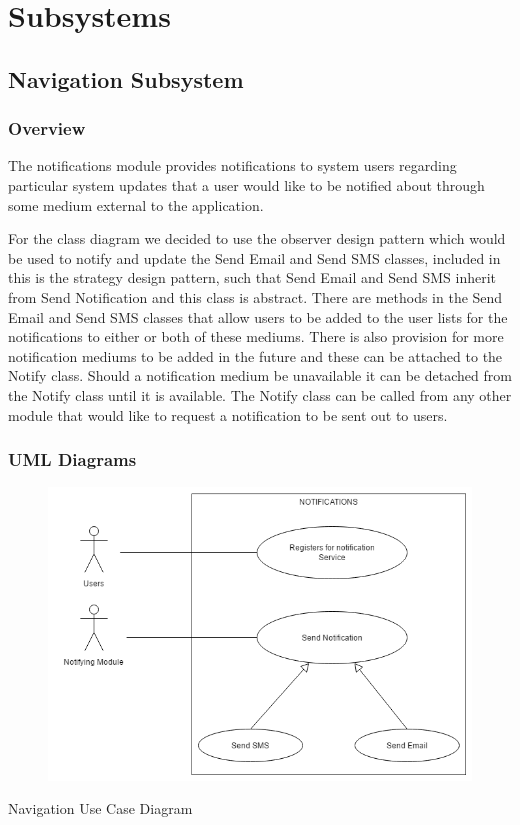 \documentclass{article}
\begin{document}
\section{Subsystems}
\subsection{Navigation Subsystem}
\subsubsection{Overview}
The notifications module provides notifications to system users regarding
particular system updates that a user would like to be notified about through
some medium external to the application.
\begin{flushleft}
For the class diagram we decided to use the observer design pattern which would be used to notify and update the Send Email and Send SMS classes, included in this is the strategy design pattern, such that Send Email and Send SMS inherit from Send Notification and this class is abstract. There are methods in the Send Email and Send SMS classes that allow users to be added to the user lists for the notifications to either or both of these mediums. There is also provision for more notification mediums to be added in the future and these can be attached to the Notify class. Should a notification medium be unavailable it can be detached from the Notify class until it is available. The Notify class can be called from any other module that would like to request a notification to be sent out to users.
\end{flushleft}

\subsubsection{UML Diagrams}	
\begin{figure}[h!]
  \includegraphics[width=\textwidth]{Notifications_Use_Case.png}
\end{figure}
Navigation Use Case Diagram
\end{document}
